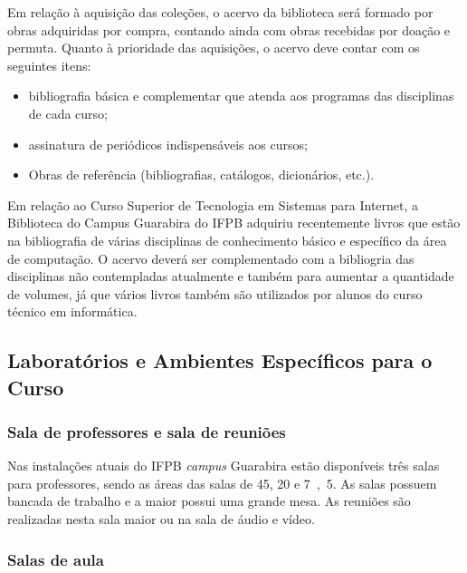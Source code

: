 Em relação à aquisição das coleções, o acervo da biblioteca será formado por obras adquiridas por compra, contando ainda com obras recebidas por doação e permuta. Quanto à prioridade das aquisições, o acervo deve contar com os seguintes itens: 

\begin{itemize}
	\item bibliografia básica e complementar que atenda aos programas das disciplinas de cada curso; 
	\item assinatura de periódicos indispensáveis aos cursos; 
	\item Obras de referência (bibliografias, catálogos, dicionários, etc.). 
\end{itemize}

Em relação ao Curso Superior de Tecnologia em Sistemas para Internet, a Biblioteca do Campus Guarabira do IFPB adquiriu recentemente livros que estão na bibliografia de várias disciplinas de conhecimento básico e específico da área de computação. O acervo deverá ser complementado com a bibliogria das disciplinas não contempladas atualmente e também para aumentar a quantidade de volumes, já que vários livros também são utilizados por alunos do curso técnico em informática.
 
\subsection{Laboratórios e Ambientes Específicos para o Curso}

\subsubsection{Sala de professores e sala de reuni\~oes}

Nas instalações atuais do IFPB \textit{campus} Guarabira estão disponíveis três salas para professores, sendo as áreas das salas de \unit{45}{\squaremetre}, \unit{20}{\squaremetre} e \unit{7,5}{\squaremetre}. As salas possuem bancada de trabalho e a maior possui uma grande mesa. As reuniões são realizadas nesta sala maior ou na sala de áudio e vídeo.


\subsubsection{Salas de aula}

